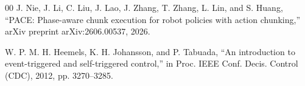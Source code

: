 \documentclass[conference]{IEEEtran}
\begin{document}
\begin{thebibliography}{00}
 J. Nie, J. Li, C. Liu, J. Lao, J. Zhang, T. Zhang, L. Lin, and S. Huang, ``PACE: Phase-aware chunk execution for robot policies with action chunking,'' arXiv preprint arXiv:2606.00537, 2026.

 W. P. M. H. Heemels, K. H. Johansson, and P. Tabuada, ``An introduction to event-triggered and self-triggered control,'' in Proc. IEEE Conf. Decis. Control (CDC), 2012, pp. 3270--3285.


\end{thebibliography}
\end{document}
